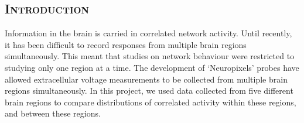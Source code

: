 \documentclass[a0,portrait]{a0poster}
\begin{document}

\begin{multicols}{2} %

%
%
%
%



\section*{\color{NavyBlue}\textsc{Introduction}\color{Black}}

Information in the brain is carried in correlated network activity. Until recently, it has been difficult to record responses from multiple brain regions simultaneously. This meant that studies on network behaviour were restricted to studying only one region at a time. The development of `Neuropixels' probes have allowed extracellular voltage measurements to be collected from multiple brain regions simultaneously. In this project, we used data collected from five different brain regions to compare distributions of correlated activity within these regions, and between these regions.


\end{multicols}
\end{document}
